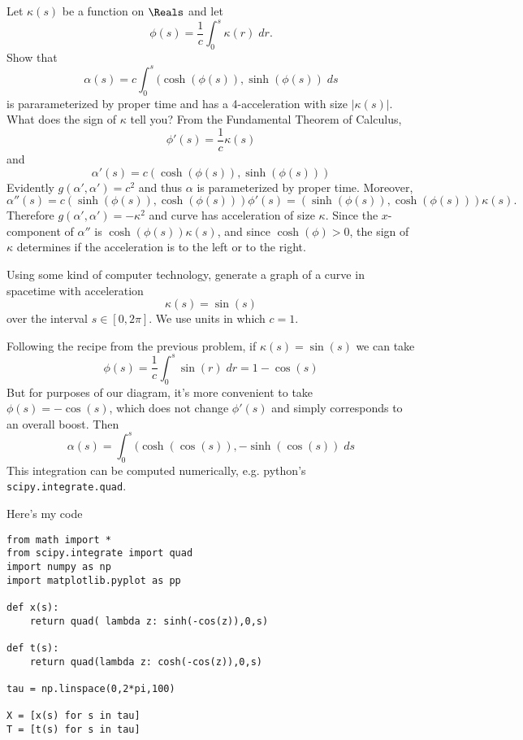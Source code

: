 \documentclass[minion]{homework}
\begin{document}
\begin{aproblems}
\hproblem 
Let $\kappa(s)$ be a function on $\Reals$ and let
\begin{equation}
\phi(s) = \frac{1}{c} \int_0^s \kappa(r)\; dr.
\end{equation}
Show that
\begin{equation}
\alpha(s) = c \int_0^s (\cosh(\phi(s)),\sinh(\phi(s))\; ds
\end{equation}
is pararameterized by proper time and has a 4-acceleration with
size $|\kappa(s)|$.  What does the sign of $\kappa$ tell you?
\solution
From the Fundamental Theorem of Calculus,
\[
\phi'(s) = \frac{1}{c} \kappa(s)
\]
and
\[
\alpha'(s) = c (\cosh(\phi(s)),\sinh(\phi(s)))
\]
Evidently $g(\alpha',\alpha')=c^2$ and thus $\alpha$ is parameterized
by proper time.  Moreover,
\[
\alpha''(s) = c(\sinh(\phi(s)),\cosh(\phi(s)))\phi'(s) = 
(\sinh(\phi(s)),\cosh(\phi(s)))\kappa(s).
\]
Therefore $g(\alpha',\alpha') = - \kappa^2 $ and curve has acceleration 
of size $\kappa$.  Since the $x$-component of $\alpha''$ is 
$\cosh(\phi(s))\kappa(s)$, and since $\cosh(\phi)>0$, the sign of $\kappa$
determines if the acceleration is to the left or to the right.

\hproblem Using some kind of computer technology, generate a graph of a curve in spacetime with acceleration 
\begin{equation}
\kappa(s) = \sin(s)
\end{equation}
over the interval $s\in [0,2\pi]$.
\solution
We use units in which $c=1$.

Following the recipe from the previous problem, if 
$\kappa(s)=\sin(s)$ we can take
\[
\phi(s) = \frac{1}{c} \int_0^s \sin(r)\; dr =  1-\cos(s)
\]
But for purposes of our diagram, it's more convenient to take
$\phi(s)=-\cos(s)$, which does not change $\phi'(s)$ and simply corresponds
to an overall boost.  Then
\[
\alpha(s) = \int_0^s (\cosh(\cos(s)),-\sinh(\cos(s))\; ds
\]
This integration can be computed numerically, e.g. python's \texttt{scipy.integrate.quad}.

Here's my code
\begin{verbatim}
from math import *
from scipy.integrate import quad
import numpy as np
import matplotlib.pyplot as pp

def x(s):
	return quad( lambda z: sinh(-cos(z)),0,s)

def t(s):
	return quad(lambda z: cosh(-cos(z)),0,s)

tau = np.linspace(0,2*pi,100)

X = [x(s) for s in tau]
T = [t(s) for s in tau]


\end{verbatim}
\end{aproblems}
\end{document}
